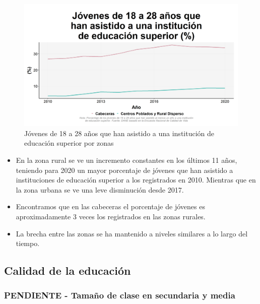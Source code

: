     \begin{figure}[H]
        \caption{Jóvenes de 18 a 28 años que han asistido a una institución de educación superior por zonas \label{map_result_2} }
        \begin{center}
        \includegraphics[width=\textwidth,keepaspectratio]{img/var_128_trend.png}
        \end{center}
    \end{figure}
            \begin{itemize}
                \item En la zona rural se ve un incremento constantes en los últimos 11 años, teniendo para 2020 un mayor porcentaje de jóvenes que han asistido a instituciones de educación superior a los registrados en 2010. Mientras que en la zona urbana se ve una leve disminución desde 2017.
                \item Encontramos que en las cabeceras el porcentaje de jóvenes es aproximadamente 3 veces los registrados en las zonas rurales.
                \item La brecha entre las zonas se ha mantenido a niveles similares a lo largo del tiempo.
                \end{itemize}

    \subsection{Calidad de la educación}
        \subsubsection{PENDIENTE - Tamaño de clase en secundaria y media}

